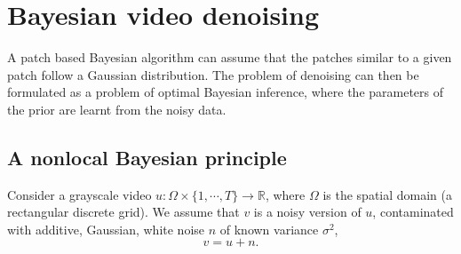 \documentclass[10pt, journal, twocolumn, final, a4paper]{IEEEtran}
\newcommand{\ma}[1]{\boldsymbol{#1}}
\newcommand{\ie}{\emph{i.e}. } \newcommand{\Ie}{\emph{I.e}. }
\begin{document}
\section{Bayesian video denoising}
\label{sec:review_nonlocal_Bayes}

A patch based Bayesian algorithm can assume that the patches similar to a given
patch follow a Gaussian distribution.
The problem 
of denoising can then be formulated as a problem of optimal Bayesian inference, where the
parameters of the prior are learnt from the noisy data.

%



\subsection{A nonlocal Bayesian principle}

Consider a grayscale video $u:\Omega\times \{1,\cdots,T\}\rightarrow
\mathbb R$, where $\Omega$ is the spatial domain (a rectangular discrete grid).
We assume that $v$ is a noisy version of $u$, contaminated with additive,
Gaussian, white noise $n$ of known variance $\sigma^2$,
\[v = u + n.\]
\end{document}
